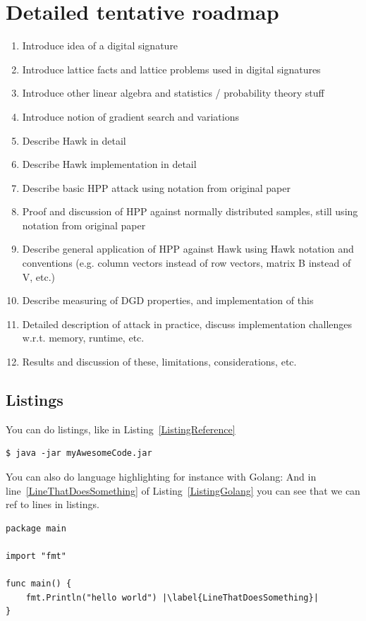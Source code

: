 \section{Detailed tentative roadmap}
\begin{enumerate}
    \item Introduce idea of a digital signature
    \item Introduce lattice facts and lattice problems used in digital signatures
    \item Introduce other linear algebra and statistics / probability theory stuff
    \item Introduce notion of gradient search and variations
    \item Describe Hawk in detail
    \item Describe Hawk implementation in detail
    \item Describe basic HPP attack using notation from original paper
    \item Proof and discussion of HPP against normally distributed samples, still using notation from original paper
    \item Describe general application of HPP against Hawk using Hawk notation and conventions (e.g. column vectors instead of row vectors,
        matrix B instead of V, etc.)
    \item Describe measuring of DGD properties, and implementation of this
    \item Detailed description of attack in practice, discuss implementation challenges w.r.t. memory, runtime, etc.
    \item Results and discussion of these, limitations, considerations, etc.
\end{enumerate}
\subsection{Listings}
You can do listings, like in Listing~\ref{ListingReference}
\begin{lstlisting}[caption={[Short caption]Look at this cool listing. Find the rest in Appendix~\ref{Listing}},label=ListingReference]
$ java -jar myAwesomeCode.jar
\end{lstlisting}

You can also do language highlighting for instance with Golang:
And in line~\ref{LineThatDoesSomething} of Listing~\ref{ListingGolang} you can see that we can ref to lines in listings.

\begin{lstlisting}[caption={Hello world in Golang},label=ListingGolang,escapechar=|]
package main

import "fmt"

func main() {
    fmt.Println("hello world") |\label{LineThatDoesSomething}|
}

\end{lstlisting}

